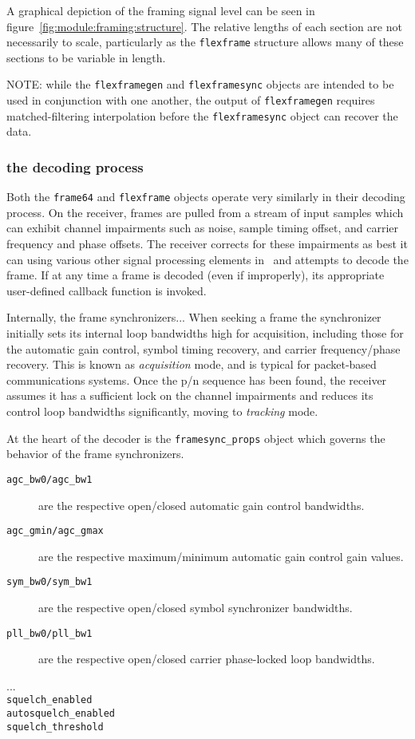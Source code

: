 A graphical depiction of the framing signal level can be seen in
figure~\ref{fig:module:framing:structure}.
The relative lengths of each section are not necessarily to scale,
particularly as the {\tt flexframe} structure allows many of these sections to
be variable in length.

NOTE: while the {\tt flexframegen} and {\tt flexframesync} objects are
intended to be used in conjunction with one another, the output of
{\tt flexframegen} requires matched-filtering interpolation before the
{\tt flexframesync} object can recover the data.


\subsubsection{the decoding process}
\label{module:framing:frames:decoding}
Both the {\tt frame64} and {\tt flexframe} objects operate very similarly in
their decoding process.
On the receiver, frames are pulled from a stream of input samples which can
exhibit channel impairments such as noise, sample timing offset, and carrier
frequency and phase offsets.
The receiver corrects for these impairments as best it can using various other
signal processing elements in \liquid\ and attempts to decode the frame.
If at any time a frame is decoded (even if improperly), its appropriate
user-defined callback function is invoked.

Internally, the frame synchronizers...
When seeking a frame the synchronizer initially sets its internal loop
bandwidths high for acquisition, including those for the automatic gain
control, symbol timing recovery, and carrier frequency/phase recovery.
This is known as {\em acquisition} mode, and is typical for packet-based
communications systems.
Once the p/n sequence has been found, the receiver assumes it has a sufficient
lock on the channel impairments and reduces its control loop bandwidths
significantly, moving to {\em tracking} mode.

At the heart of the decoder is the {\tt framesync\_props} object which governs
the behavior of the frame synchronizers.
\begin{description}
\item[{\tt agc\_bw0/agc\_bw1}]
    are the respective open/closed automatic gain control bandwidths.
\item[{\tt agc\_gmin/agc\_gmax}]
    are the respective maximum/minimum automatic gain control gain values.
\item[{\tt sym\_bw0/sym\_bw1}]
    are the respective open/closed symbol synchronizer bandwidths.
\item[{\tt pll\_bw0/pll\_bw1}]
    are the respective open/closed carrier phase-locked loop bandwidths.
\item[...]
\item[{\tt squelch\_enabled}]
\item[{\tt autosquelch\_enabled}]
\item[{\tt squelch\_threshold}]
\end{description}


